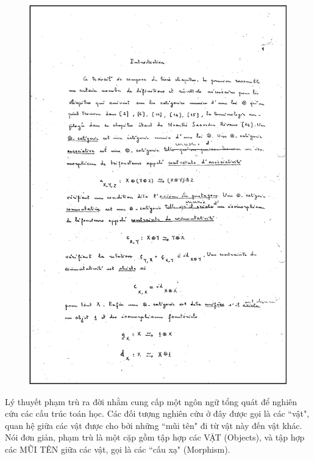 \begin{multicols}{2}
\begin{figure}[H]
		\includegraphics[height= 0.72\linewidth]{Anh22}
		\vspace*{-10pt}
	\end{figure}
	Lý thuyết phạm trù ra đời nhằm cung cấp một ngôn ngữ tổng quát để nghiên cứu các cấu trúc toán học. Các đối tượng nghiên cứu ở đây được gọi là các ``vật", quan hệ giữa các vật được cho bởi những ``mũi tên" đi từ vật này đến vật khác. Nói đơn giản, phạm trù là một cặp gồm tập hợp các VẬT (Objects), và tập hợp các MŨI TÊN giữa các  vật, gọi là các ``cấu xạ" (Morphism).
	\vskip 0.1cm
	

\end{multicols}
